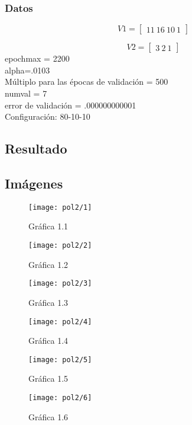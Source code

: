 \documentclass[6pt]{article}
\begin{document}
\subsubsection{Datos}
\[V1=
\begin{bmatrix}
11\ 16\ 10\ 1
\end{bmatrix}\]

\[V2=
\begin{bmatrix}
3\ 2\ 1
\end{bmatrix}\]
epochmax = 2200\\
alpha=.0103\\
Múltiplo para las épocas de validación = 500\\
numval = 7\\
error de validación = .000000000001\\
Configuración: 80-10-10
\subsection{Resultado}
\subsection{Imágenes}
\begin{figure}[htpb]
	\centering
	\texttt{[image: pol2/1]}
	\caption{Gráfica 1.1}
\end{figure}

\begin{figure}[htpb]
	\centering
	\texttt{[image: pol2/2]}
	\caption{Gráfica 1.2}
\end{figure}

\begin{figure}[htpb]
	\centering
	\texttt{[image: pol2/3]}
	\caption{Gráfica 1.3}
\end{figure}

\begin{figure}[htpb]
	\centering
	\texttt{[image: pol2/4]}
	\caption{Gráfica 1.4}
\end{figure}

\begin{figure}[htpb]
	\centering
	\texttt{[image: pol2/5]}
	\caption{Gráfica 1.5}
\end{figure}

\begin{figure}[htpb]
	\centering
	\texttt{[image: pol2/6]}
	\caption{Gráfica 1.6}
\end{figure}
\end{document}
